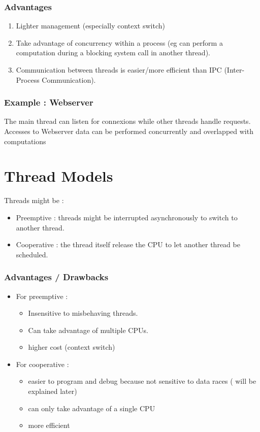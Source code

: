 \documentclass[a4paper,10pt]{article}
\begin{document}
\subsubsection*{Advantages}
\begin{enumerate}[label=-]
	\item Lighter management (especially context switch)
	\item Take advantage of concurrency within a process (eg can perform a computation during a blocking system call in another thread).
	\item Communication between threads is easier/more efficient than IPC (Inter-Process Communication).
\end{enumerate}

\subsubsection*{Example : Webserver}
The main thread can listen for connexions while other threads handle requests.
Accesses to Webserver data can be performed concurrently and overlapped with computations

\section{Thread Models}

Threads might be :
\begin{itemize}
\item Preemptive : threads might be interrupted asynchronously to switch to another thread. 
\item Cooperative : the thread itself release the CPU to let another thread be scheduled.
\end{itemize}

\subsubsection*{Advantages / Drawbacks}

\begin{itemize}
 \item For preemptive :
\begin{itemize} 
\item Insensitive to misbehaving threads.
\item Can take advantage of multiple CPUs.
\item higher cost (context switch) 
\end{itemize}

\item For cooperative :
 \begin{itemize}
 
\item easier to program and debug  because not sensitive to data races ( will be explained later) 
\item can only take advantage of a single CPU 
\item more efficient
\end{itemize}
\end{itemize}
\end{document}
